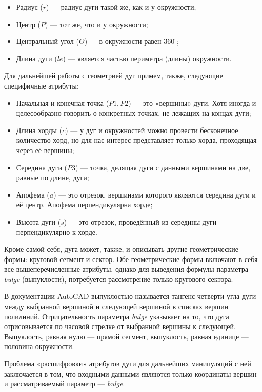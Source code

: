 \begin{itemize}
	\item Радиус ($r$) --- радиус дуги такой же, как и у окружности;
	\item Центр ($P$) --- тот же, что и у окружности;
	\item Центральный угол ($\Theta$) --- в окружности равен $360^{\circ}$;
	\item Длина дуги ($le$) --- является частью периметра (длины) окружности.
\end{itemize}

Для дальнейшей работы с геометрией дуг примем, также, следующие специфичные атрибуты:

\begin{itemize}
	\item Начальная и конечная точка ($P1, P2$) --- это «вершины» дуги. Хотя иногда и целесообразно говорить о конкретных точках, не лежащих на концах дуги;
	\item Длина хорды ($c$) --- у дуг и окружностей можно провести бесконечное количество хорд, но для нас интерес представляет только хорда, проходящая через её вершины;
	\item Середина дуги ($P3$) --- точка, делящая дуги с данными вершинами на две, равные по длине, дуги;
	\item Апофема ($a$) --- это отрезок, вершинами которого являются середина дуги и её центр. Апофема перпендикулярна хорде;
	\item Высота дуги ($s$) --- это отрезок, проведённый из середины дуги перпендикулярно к хорде.
\end{itemize}

Кроме самой себя, дуга может, также, и описывать другие геометрические формы: круговой сегмент и сектор. Обе геометрические формы включают в себя все вышеперечисленные атрибуты, однако для выведения формулы параметра \textit{bulge} (выпуклости), потребуется рассмотрение только кругового сектора.

В документации AutoCAD \cite{autocad2012dxf} выпуклостью называется тангенс четверти угла дуги между выбранной вершиной и следующей вершиной в списках вершин полилиний. Отрицательность параметра \textit{bulge} указывает на то, что дуга отрисовывается по часовой стрелке от выбранной вершины к следующей. Выпуклость, равная нулю --- прямой сегмент, выпуклость, равная единице --- половина окружности.

Проблема «расшифровки» атрибутов дуги для дальнейших манипуляций с ней заключается в том, что входными данными являются только координаты вершин и рассматриваемый параметр --- \textit{bulge}.

